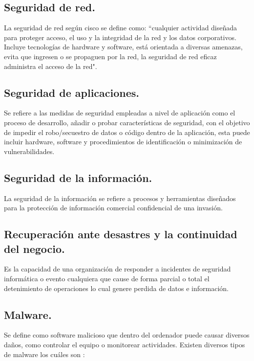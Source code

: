 \documentclass[10pt]{article}
\begin{document}
\subsection{Seguridad de red.}

La seguridad de red según cisco se define como: ``cualquier actividad diseñada para proteger acceso, el uso y la integridad de la red y los datos corporativos. Incluye tecnologías de hardware y software, está orientada a diversas amenazas, evita que ingresen o se propaguen por la red, la seguridad de red eficaz administra el acceso de la red". \cite{1}

\subsection{Seguridad de aplicaciones.}

Se refiere a las medidas de seguridad empleadas a nivel de aplicación como el proceso de desarrollo, añadir o probar características de seguridad, con el objetivo de impedir el robo/secuestro de datos o código dentro de la aplicación, esta puede incluir hardware, software y procedimientos de identificación o minimización de vulnerabilidades. \cite{2}

\subsection{Seguridad de la información.}

La seguridad de la información se refiere a procesos y herramientas diseñados para la protección de información comercial confidencial de una invasión. \cite{3}

\subsection{Recuperación ante desastres y la continuidad del
negocio.}

Es la capacidad de una organización de responder a incidentes de seguridad informática o evento cualquiera que cause de forma parcial o total el detenimiento de operaciones lo cual genere perdida de datos e información. \cite{4}

\subsection{Malware.}

Se define como software malicioso que dentro del ordenador puede causar diversos daños, como controlar el equipo o monitorear actividades. Existen diversos tipos de malware los cuáles son \cite{6}:
\end{document}
